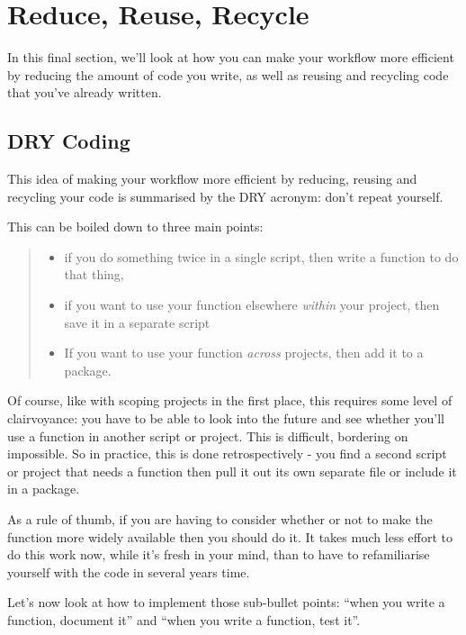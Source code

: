 \documentclass[
  12pt,
]{book}
\providecommand{\tightlist}{%
  \setlength{\itemsep}{0pt}\setlength{\parskip}{0pt}}
\begin{document}
\hypertarget{reduce-reuse-recycle}{%
\section{Reduce, Reuse, Recycle}\label{reduce-reuse-recycle}}

In this final section, we'll look at how you can make your workflow more efficient by reducing the amount of code you write, as well as reusing and recycling code that you've already written.

\hypertarget{dry-coding}{%
\subsection{DRY Coding}\label{dry-coding}}

This idea of making your workflow more efficient by reducing, reusing and recycling your code is summarised by the DRY acronym: don't repeat yourself.

This can be boiled down to three main points:

\begin{quote}
\begin{itemize}
\tightlist
\item
  if you do something twice in a single script, then write a function to do that thing,
\item
  if you want to use your function elsewhere \emph{within} your project, then save it in a separate script
\item
  If you want to use your function \emph{across} projects, then add it to a package.
\end{itemize}
\end{quote}

Of course, like with scoping projects in the first place, this requires some level of clairvoyance: you have to be able to look into the future and see whether you'll use a function in another script or project. This is difficult, bordering on impossible. So in practice, this is done retrospectively - you find a second script or project that needs a function then pull it out its own separate file or include it in a package.

As a rule of thumb, if you are having to consider whether or not to make the function more widely available then you should do it. It takes much less effort to do this work now, while it's fresh in your mind, than to have to refamiliarise yourself with the code in several years time.

Let's now look at how to implement those sub-bullet points:
``when you write a function, document it'' and ``when you write a function, test it''.
\end{document}
